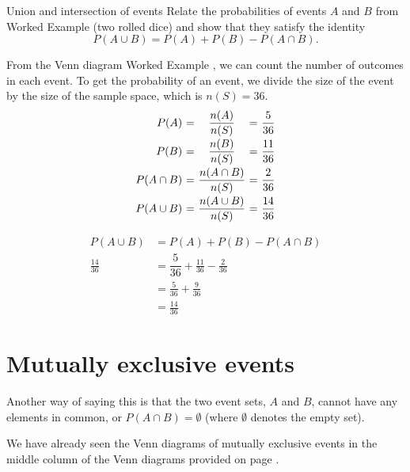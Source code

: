 \begin{wex}{Union and intersection of events}
{Relate the probabilities of events $A$ and $B$ from
  Worked Example 
  (two rolled dice) and show that they satisfy the identity
  \[P(A \cup B) = P(A) + P(B) - P(A \cap B).\]
}{
  
  From the Venn diagram
  Worked Example ,
 we can count the number of outcomes in each
  event. To get the probability of an event, we divide the size of
  the event by the size of the sample space, which is $n(S)=36$.
  \[\begin{array}{r@{$\ =\ $}c@{$\ =\ $}l}
    P(A)        & \dfrac{n(A)}{n(S)}        & \dfrac{5}{36}  \\[8pt]
    P(B)        & \dfrac{n(B)}{n(S)}        & \dfrac{11}{36} \\[8pt]
    P(A \cap B) & \dfrac{n(A \cap B)}{n(S)} & \dfrac{2}{36}  \\[8pt]
    P(A \cup B) & \dfrac{n(A \cup B)}{n(S)} & \dfrac{14}{36}
  \end{array}\]

  \begin{align*}
    P(A \cup B) &= P(A) + P(B) - P(A \cap B) \\
    \frac{14}{36} &= \dfrac{5}{36} + \frac{11}{36} - \frac{2}{36} \\
    &= \frac{5}{36} + \frac{9}{36} \\
    &= \frac{14}{36} 
  \end{align*}
}
\end{wex}

\section{Mutually exclusive events}

Another way of saying this is that the two event sets, $A$ and $B$,
cannot have any elements in common, or $P(A \cap B) = \emptyset$
(where $\emptyset$ denotes the empty set).

We have already seen the Venn diagrams of mutually exclusive events in
the middle column of the Venn diagrams provided on page \pageref{fig:venn_union_intersection}.

